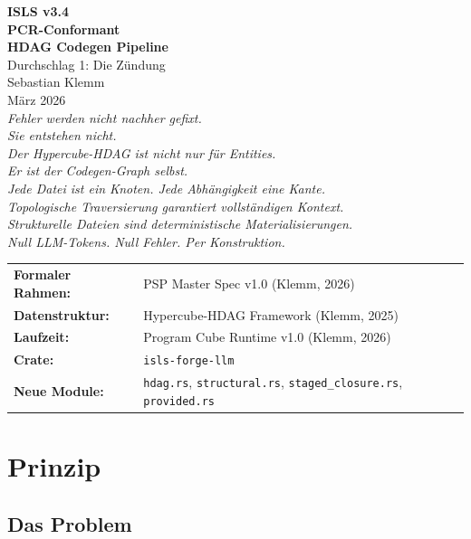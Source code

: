 \documentclass[11pt,a4paper]{article}
\begin{document}
\begin{titlepage}
\begin{center}
\vspace*{1cm}
{\Huge\bfseries ISLS v3.4}\\[0.3cm]
{\Huge\bfseries PCR-Conformant}\\[0.2cm]
{\Huge\bfseries HDAG Codegen Pipeline}\\[1cm]
{\LARGE Durchschlag 1: Die Zündung}\\[1.5cm]
{\Large Sebastian Klemm}\\[0.3cm]
{\small März 2026}\\[2cm]

{\itshape
Fehler werden nicht nachher gefixt.\\
Sie entstehen nicht.\\[0.3cm]
Der Hypercube-HDAG ist nicht nur für Entities.\\
Er ist der Codegen-Graph selbst.\\
Jede Datei ist ein Knoten. Jede Abhängigkeit eine Kante.\\
Topologische Traversierung garantiert vollständigen Kontext.\\[0.3cm]
Strukturelle Dateien sind deterministische Materialisierungen.\\
Null LLM-Tokens. Null Fehler. Per Konstruktion.
}

\vfill
\begin{tabular}{ll}
\textbf{Formaler Rahmen:} & PSP Master Spec v1.0 (Klemm, 2026) \\
\textbf{Datenstruktur:} & Hypercube-HDAG Framework (Klemm, 2025) \\
\textbf{Laufzeit:} & Program Cube Runtime v1.0 (Klemm, 2026) \\
\textbf{Crate:} & \texttt{isls-forge-llm} \\
\textbf{Neue Module:} & \texttt{hdag.rs}, \texttt{structural.rs}, \texttt{staged\_closure.rs}, \texttt{provided.rs} \\
\end{tabular}
\end{center}
\end{titlepage}

\tableofcontents
\newpage

\section{Prinzip}

\subsection{Das Problem}
\end{document}
